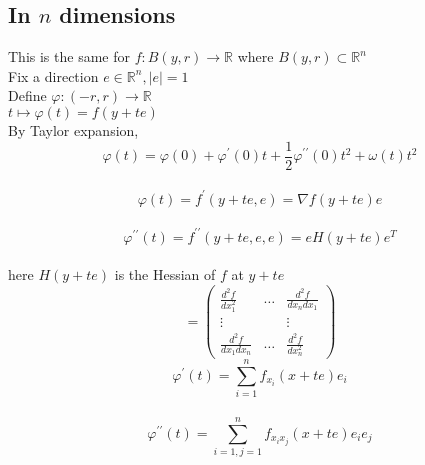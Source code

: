 \documentclass[12pt]{article}
\newcommand{\BR}{\mathbb R}
\newcommand{\phii}{\varphi}
\newcommand{\doubleprime}{^{\prime\prime}}
\begin{document}
  \subsection{In $n$ dimensions}
    This is the same for $f:B(y,r)\rightarrow\BR$ where $B(y,r)\subset\BR^n$\\
    Fix a direction $e\in\BR^n, |e|=1$\\
    Define $\phii:(-r,r)\rightarrow\BR$\\
    \indent\indent$t\mapsto\phii(t)=f(y+te)$\\
    By Taylor expansion,\\
    \[\phii(t)=\phii(0)+\phii^\prime(0)t+\frac{1}{2}\phii\doubleprime(0)t^2+\omega(t)t^2\]\\
    \[\phii(t)=f^\prime(y+te,e)=\nabla f(y+te)e\]\\
    \[\phii\doubleprime(t)=f\doubleprime(y+te,e,e)=eH(y+te)e^T\]\\
    here $H(y+te)$ is the Hessian of $f$ at $y+te$\\
    \[=\begin{pmatrix}
      \frac{d^2f}{dx_{1}^{2}} & \dots & \frac{d^2f}{dx_ndx_1} \\
      \vdots & & \vdots \\
      \frac{d^2f}{dx_1dx_n} & \dots & \frac{d^2f}{dx_{n}^{2}}
    \end{pmatrix}
    \]
    \[\phii^\prime(t)=\sum\limits_{i=1}^{n}f_{x_i}(x+te)e_i\]\\
    \[\phii\doubleprime(t)=\sum\limits_{i=1, j=1}^{n}f_{x_ix_j}(x+te)e_ie_j\]
\end{document}
